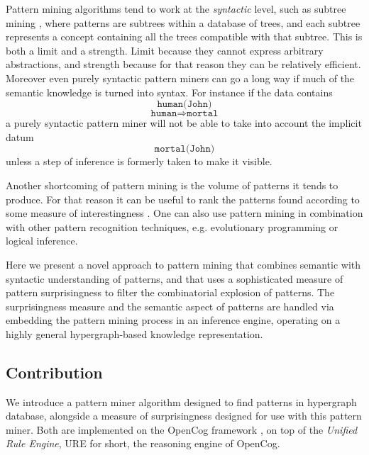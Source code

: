 \documentclass[runningheads]{llncs}
\begin{document}
Pattern mining algorithms tend to work at the
\emph{syntactic} level, such as subtree mining \cite{Chi2005Freq},
where patterns are subtrees within a database of trees, and each
subtree represents a concept containing all the trees compatible with
that subtree. This is both a limit and a strength. Limit because they
cannot express arbitrary abstractions, and strength because for that
reason they can be relatively efficient. Moreover even purely
syntactic pattern miners can go a long way if much of the semantic
knowledge is turned into syntax. For instance if the data contains
$$\texttt{human(John)}$$
$$\texttt{human}\Rightarrow\texttt{mortal}$$ a purely syntactic
pattern miner will not be able to take into account the implicit
datum $$\texttt{mortal(John)}$$ unless a step of inference is formerly
taken to make it visible.

Another shortcoming of pattern mining is the volume of patterns it
tends to produce. For that reason it can be useful to rank the patterns found
according to some measure of interestingness \cite{Vreeken2014}.  One can
also use pattern mining in combination with other pattern recognition techniques,
e.g. evolutionary programming or logical inference.

Here we present a novel approach to pattern mining that combines semantic
with syntactic understanding of patterns, and that uses a sophisticated
measure of pattern surprisingness to filter the combinatorial explosion of
patterns.   The surprisingness measure and the semantic aspect of patterns
are handled via embedding the pattern mining process in an inference engine,
operating on a highly general hypergraph-based knowledge representation.

\subsection{Contribution}

We introduce a pattern miner algorithm designed to find patterns in
hypergraph database, alongside a measure of surprisingness designed
for use with this pattern miner. Both are implemented on the OpenCog
framework \cite{Goertzel2014EGI2}, on top of the \emph{Unified Rule
  Engine}, URE for short, the reasoning engine of OpenCog.
\end{document}

